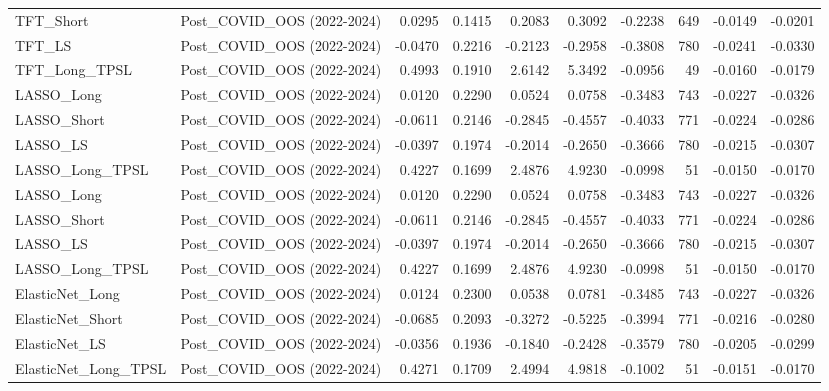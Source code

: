 \begin{tabular}{llrrrrrrrr}
\cline{1-10}
TFT\_Short & Post\_COVID\_OOS (2022-2024) & 0.0295 & 0.1415 & 0.2083 & 0.3092 & -0.2238 & 649 & -0.0149 & -0.0201 \\
\cline{1-10}
TFT\_LS & Post\_COVID\_OOS (2022-2024) & -0.0470 & 0.2216 & -0.2123 & -0.2958 & -0.3808 & 780 & -0.0241 & -0.0330 \\
\cline{1-10}
TFT\_Long\_TPSL & Post\_COVID\_OOS (2022-2024) & 0.4993 & 0.1910 & 2.6142 & 5.3492 & -0.0956 & 49 & -0.0160 & -0.0179 \\
\cline{1-10}
LASSO\_Long & Post\_COVID\_OOS (2022-2024) & 0.0120 & 0.2290 & 0.0524 & 0.0758 & -0.3483 & 743 & -0.0227 & -0.0326 \\
\cline{1-10}
LASSO\_Short & Post\_COVID\_OOS (2022-2024) & -0.0611 & 0.2146 & -0.2845 & -0.4557 & -0.4033 & 771 & -0.0224 & -0.0286 \\
\cline{1-10}
LASSO\_LS & Post\_COVID\_OOS (2022-2024) & -0.0397 & 0.1974 & -0.2014 & -0.2650 & -0.3666 & 780 & -0.0215 & -0.0307 \\
\cline{1-10}
LASSO\_Long\_TPSL & Post\_COVID\_OOS (2022-2024) & 0.4227 & 0.1699 & 2.4876 & 4.9230 & -0.0998 & 51 & -0.0150 & -0.0170 \\
\cline{1-10}
LASSO\_Long & Post\_COVID\_OOS (2022-2024) & 0.0120 & 0.2290 & 0.0524 & 0.0758 & -0.3483 & 743 & -0.0227 & -0.0326 \\
\cline{1-10}
LASSO\_Short & Post\_COVID\_OOS (2022-2024) & -0.0611 & 0.2146 & -0.2845 & -0.4557 & -0.4033 & 771 & -0.0224 & -0.0286 \\
\cline{1-10}
LASSO\_LS & Post\_COVID\_OOS (2022-2024) & -0.0397 & 0.1974 & -0.2014 & -0.2650 & -0.3666 & 780 & -0.0215 & -0.0307 \\
\cline{1-10}
LASSO\_Long\_TPSL & Post\_COVID\_OOS (2022-2024) & 0.4227 & 0.1699 & 2.4876 & 4.9230 & -0.0998 & 51 & -0.0150 & -0.0170 \\
\cline{1-10}
ElasticNet\_Long & Post\_COVID\_OOS (2022-2024) & 0.0124 & 0.2300 & 0.0538 & 0.0781 & -0.3485 & 743 & -0.0227 & -0.0326 \\
\cline{1-10}
ElasticNet\_Short & Post\_COVID\_OOS (2022-2024) & -0.0685 & 0.2093 & -0.3272 & -0.5225 & -0.3994 & 771 & -0.0216 & -0.0280 \\
\cline{1-10}
ElasticNet\_LS & Post\_COVID\_OOS (2022-2024) & -0.0356 & 0.1936 & -0.1840 & -0.2428 & -0.3579 & 780 & -0.0205 & -0.0299 \\
\cline{1-10}
ElasticNet\_Long\_TPSL & Post\_COVID\_OOS (2022-2024) & 0.4271 & 0.1709 & 2.4994 & 4.9818 & -0.1002 & 51 & -0.0151 & -0.0170 \\

\end{tabular}
